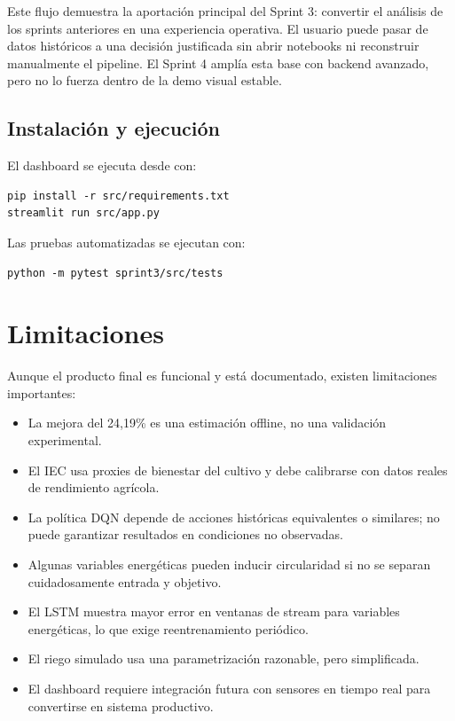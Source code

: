 ﻿\documentclass[11pt,a4paper]{article}
\newcommand{\code}[1]{\colorbox{lightbg}{\texttt{\small\detokenize{#1}}}}
\begin{document}
Este flujo demuestra la aportación principal del Sprint 3: convertir el análisis de los sprints anteriores en una experiencia operativa. El usuario puede pasar de datos históricos a una decisión justificada sin abrir notebooks ni reconstruir manualmente el pipeline. El Sprint 4 amplía esta base con backend avanzado, pero no lo fuerza dentro de la demo visual estable.

\subsection{Instalación y ejecución}

El dashboard se ejecuta desde \code{sprint3/} con:

\begin{verbatim}
pip install -r src/requirements.txt
streamlit run src/app.py
\end{verbatim}

Las pruebas automatizadas se ejecutan con:

\begin{verbatim}
python -m pytest sprint3/src/tests
\end{verbatim}

\section{Limitaciones}

Aunque el producto final es funcional y está documentado, existen limitaciones importantes:

\begin{itemize}
    \item La mejora del 24,19\% es una estimación offline, no una validación experimental.
    \item El IEC usa proxies de bienestar del cultivo y debe calibrarse con datos reales de rendimiento agrícola.
    \item La política DQN depende de acciones históricas equivalentes o similares; no puede garantizar resultados en condiciones no observadas.
    \item Algunas variables energéticas pueden inducir circularidad si no se separan cuidadosamente entrada y objetivo.
    \item El LSTM muestra mayor error en ventanas de stream para variables energéticas, lo que exige reentrenamiento periódico.
    \item El riego simulado usa una parametrización razonable, pero simplificada.
    \item El dashboard requiere integración futura con sensores en tiempo real para convertirse en sistema productivo.
\end{itemize}
\newpage
\end{document}
